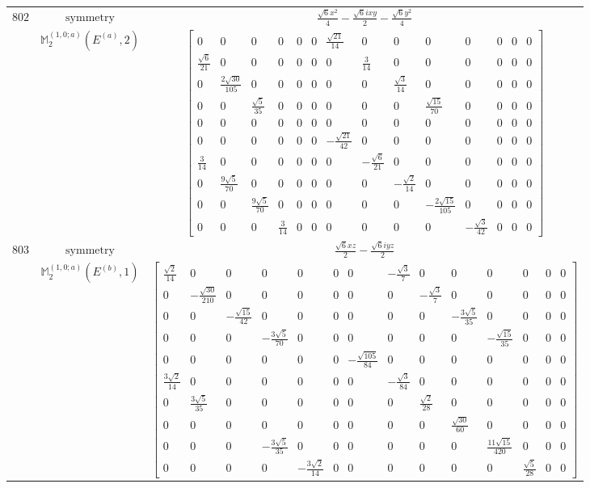 \documentclass[fleqn,8pt,landscape]{jsarticle}
\begin{document}
\begin{longtable}{ccc}
$ 802 $ & $ \text{symmetry} $ & $ \frac{\sqrt{6} x^{2}}{4} - \frac{\sqrt{6} i x y}{2} - \frac{\sqrt{6} y^{2}}{4} $ \\
$  $ & $ \mathbb{M}_{2}^{(1,0;a)}(E^{(a)},2) $ & $ \begin{bmatrix} 0 & 0 & 0 & 0 & 0 & 0 & \frac{\sqrt{21}}{14} & 0 & 0 & 0 & 0 & 0 & 0 & 0 \\ \frac{\sqrt{6}}{21} & 0 & 0 & 0 & 0 & 0 & 0 & \frac{3}{14} & 0 & 0 & 0 & 0 & 0 & 0 \\ 0 & \frac{2 \sqrt{30}}{105} & 0 & 0 & 0 & 0 & 0 & 0 & \frac{\sqrt{3}}{14} & 0 & 0 & 0 & 0 & 0 \\ 0 & 0 & \frac{\sqrt{5}}{35} & 0 & 0 & 0 & 0 & 0 & 0 & \frac{\sqrt{15}}{70} & 0 & 0 & 0 & 0 \\ 0 & 0 & 0 & 0 & 0 & 0 & 0 & 0 & 0 & 0 & 0 & 0 & 0 & 0 \\ 0 & 0 & 0 & 0 & 0 & 0 & - \frac{\sqrt{21}}{42} & 0 & 0 & 0 & 0 & 0 & 0 & 0 \\ \frac{3}{14} & 0 & 0 & 0 & 0 & 0 & 0 & - \frac{\sqrt{6}}{21} & 0 & 0 & 0 & 0 & 0 & 0 \\ 0 & \frac{9 \sqrt{5}}{70} & 0 & 0 & 0 & 0 & 0 & 0 & - \frac{\sqrt{2}}{14} & 0 & 0 & 0 & 0 & 0 \\ 0 & 0 & \frac{9 \sqrt{5}}{70} & 0 & 0 & 0 & 0 & 0 & 0 & - \frac{2 \sqrt{15}}{105} & 0 & 0 & 0 & 0 \\ 0 & 0 & 0 & \frac{3}{14} & 0 & 0 & 0 & 0 & 0 & 0 & - \frac{\sqrt{3}}{42} & 0 & 0 & 0 \end{bmatrix} $ \\ \hline
$ 803 $ & $ \text{symmetry} $ & $ \frac{\sqrt{6} x z}{2} - \frac{\sqrt{6} i y z}{2} $ \\
$  $ & $ \mathbb{M}_{2}^{(1,0;a)}(E^{(b)},1) $ & $ \begin{bmatrix} \frac{\sqrt{2}}{14} & 0 & 0 & 0 & 0 & 0 & 0 & - \frac{\sqrt{3}}{7} & 0 & 0 & 0 & 0 & 0 & 0 \\ 0 & - \frac{\sqrt{30}}{210} & 0 & 0 & 0 & 0 & 0 & 0 & - \frac{\sqrt{3}}{7} & 0 & 0 & 0 & 0 & 0 \\ 0 & 0 & - \frac{\sqrt{15}}{42} & 0 & 0 & 0 & 0 & 0 & 0 & - \frac{3 \sqrt{5}}{35} & 0 & 0 & 0 & 0 \\ 0 & 0 & 0 & - \frac{3 \sqrt{5}}{70} & 0 & 0 & 0 & 0 & 0 & 0 & - \frac{\sqrt{15}}{35} & 0 & 0 & 0 \\ 0 & 0 & 0 & 0 & 0 & 0 & - \frac{\sqrt{105}}{84} & 0 & 0 & 0 & 0 & 0 & 0 & 0 \\ \frac{3 \sqrt{2}}{14} & 0 & 0 & 0 & 0 & 0 & 0 & - \frac{\sqrt{3}}{84} & 0 & 0 & 0 & 0 & 0 & 0 \\ 0 & \frac{3 \sqrt{5}}{35} & 0 & 0 & 0 & 0 & 0 & 0 & \frac{\sqrt{2}}{28} & 0 & 0 & 0 & 0 & 0 \\ 0 & 0 & 0 & 0 & 0 & 0 & 0 & 0 & 0 & \frac{\sqrt{30}}{60} & 0 & 0 & 0 & 0 \\ 0 & 0 & 0 & - \frac{3 \sqrt{5}}{35} & 0 & 0 & 0 & 0 & 0 & 0 & \frac{11 \sqrt{15}}{420} & 0 & 0 & 0 \\ 0 & 0 & 0 & 0 & - \frac{3 \sqrt{2}}{14} & 0 & 0 & 0 & 0 & 0 & 0 & \frac{\sqrt{5}}{28} & 0 & 0 \end{bmatrix} $ \\ \hline

\end{longtable}
\end{document}
